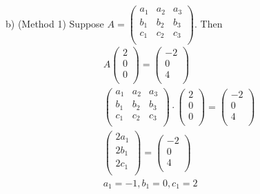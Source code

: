 \documentclass{article}
\begin{document}
b) (Method 1) 
Suppose $A = \begin{pmatrix}
                  a_1 & a_2 & a_3 \\
                  b_1 & b_2 & b_3 \\
                  c_1 & c_2 & c_3 \\  
                \end{pmatrix}$. Then
\begin{gather*}
  A \begin{pmatrix}
      2 \\
      0 \\
      0 \\
    \end{pmatrix} = 
    \begin{pmatrix}
      -2 \\
      0 \\
      4 \\
    \end{pmatrix} \\
  \begin{pmatrix}
    a_1 & a_2 & a_3 \\
    b_1 & b_2 & b_3 \\
    c_1 & c_2 & c_3 \\
  \end{pmatrix} \cdot 
  \begin{pmatrix}
    2 \\
    0 \\
    0 \\
  \end{pmatrix} = 
  \begin{pmatrix}
    -2 \\
    0 \\
    4 \\
  \end{pmatrix} \\
  \begin{pmatrix}
    2a_1 \\
    2b_1 \\
    2c_1 \\
  \end{pmatrix} = 
  \begin{pmatrix}
    -2 \\
    0 \\
    4 \\
  \end{pmatrix} \\
  a_1 = -1, b_1 = 0, c_1 = 2 \\
\end{gather*}
\end{document}
